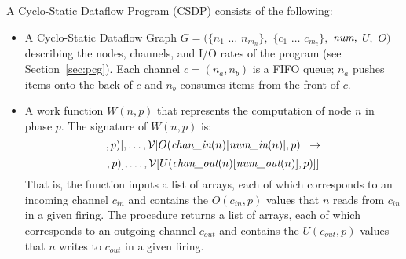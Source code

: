 \noindent A Cyclo-Static Dataflow Program (CSDP) consists of the
following:
\begin{itemize}

\item A Cyclo-Static Dataflow Graph $G = (\{n_1$ $\dots$ $n_{m_n}\},$
$\{c_1$ $\dots$ $c_{m_c}\},$ $\mbox{\it num},$ $U,$ $O)$ describing the
nodes, channels, and I/O rates of the program (see
Section~\ref{sec:pcg}).  Each channel $c = (n_a, n_b)$ is a FIFO
queue; $n_a$ pushes items onto the back of $c$ and $n_b$ consumes
items from the front of $c$.

%
\item A work function $W(n, p)$ that represents the computation of
node $n$ in phase $p$.  The signature of $W(n, p)$ is:
{\scriptsize
\begin{equation*}
[{\cal V}[O(\mt{chan\_in}(n)[1], p)], \dots, {\cal V}[O(\mt{chan\_in}(n)[\mt{num\_in}(n)], p)]] \rightarrow
\vspace{-11pt}
\end{equation*}
\begin{equation*}
[{\cal V}[U(\mt{chan\_out}(n)[1], p)], \dots, {\cal V}[U(\mt{chan\_out}(n)[\mt{num\_out}(n)], p)]]
\end{equation*}}
That is, the function inputs a list of arrays, each of which
corresponds to an incoming channel $c_{in}$ and contains the
$O(c_{in},p)$ values that $n$ reads from $c_{in}$ in a given firing.
The procedure returns a list of arrays, each of which corresponds to
an outgoing channel $c_{out}$ and contains the $U(c_{out},p)$ values
that $n$ writes to $c_{out}$ in a given firing.

\end{itemize}


